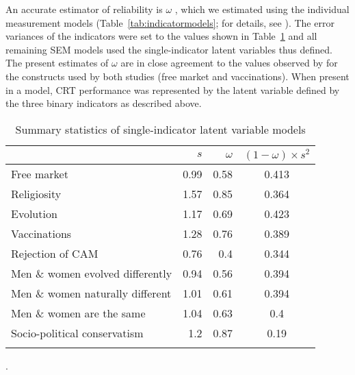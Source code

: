 \documentclass[fignum,man]{apa}\usepackage[]{graphicx}\usepackage[]{color}
\begin{document}
An accurate 
estimator of reliability 
is $\omega$ \cite{Komaroff97,Raykov97}, which
  we estimated using the individual measurement 
models (Table~\ref{tab:indicatormodels}; 
for details, see ).
The error variances of the indicators were set to 
the values shown in Table~\ref{tab:descriptives}
and all remaining SEM models used the single-indicator latent variables 
thus defined. 
The present estimates of $\omega$ are in close agreement to the values observed by 
 for the constructs used by both studies (free market and vaccinations). 
When present in a model, CRT performance was represented by the latent variable defined by the
three binary indicators as described above.

\begin{table} %
	\centering
	\caption{Summary statistics of single-indicator latent variable models}
	\label{tab:descriptives}

	\begin{tabular}{l r r c }
		\thickline
		\multicolumn{1}{c}{Construct}   & $s$ \tabfnm{\textit{a}}&  $\omega$ \tabfnm{\textit{b}}& $(1-\omega) \times s^2$ \tabfnm{\textit{c}} \\
		\hline
		Free market & 
		0.99 &
		0.58 &
		0.413 \\		
		
		Religiosity & 
		1.57 &
		0.85 &
		0.364 \\
		
		Evolution & 
		1.17 &
		0.69 &
		0.423 \\			
		
		Vaccinations & 
		1.28 &
		0.76 &
		0.389 \\		
		
        Rejection of CAM & 
		0.76 &
		0.4 &
		0.344 \\		
        
        
        Men \& women evolved differently & 
		0.94 &
		0.56 &
		0.394 \\		
        
        Men \& women naturally different & 
		1.01 &
		0.61 &
		0.394 \\		


		Men \& women are the same & 
		1.04 &
		0.63 &
		0.4 \\		
		
		Socio-political conservatism &
		1.2 &
		0.87 &
		0.19 \\		

		\thickline
	\end{tabular}
    .
\end{table}
\end{document}
